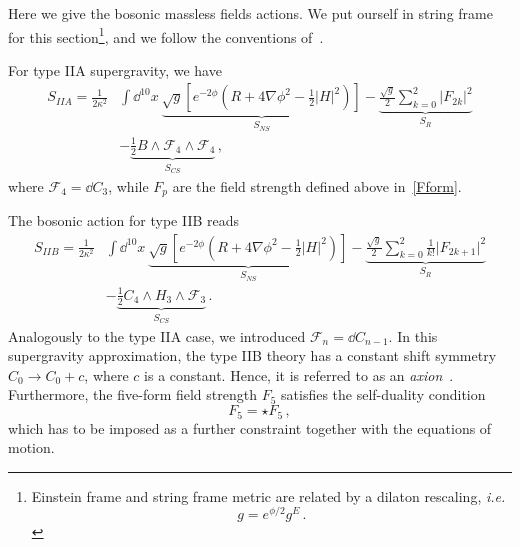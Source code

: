 \documentclass[debug]{phd}
\begin{document}
				 Here we give the bosonic massless fields actions. 
				 We put ourself in string frame for this section\footnote{%
				 	Einstein frame and string frame metric are related by a dilaton rescaling, \emph{i.e.}
							\begin{equation*}
								g = e^{\phi/2} g^E \, .
							\end{equation*}
					},
					and we follow the conventions of~\cite{DemSugra}.
				 
				 For type IIA supergravity, we have
						\begin{equation*}
							\begin{split}
								S_{IIA} = \frac{1}{2\kappa^2}& \int \dd^{10} x \ \underbrace{\sqrt{g} \left[ e^{-2\phi} \left(R + 4 \nabla \phi ^2 - \frac{1}{2} \lvert H \rvert^2 \right)\right]}_{S_{NS}} - \underbrace{\frac{\sqrt{g}}{2} \sum_{k=0}^2 \lvert F_{2k} \rvert^2}_{S_{R}} \\
								&- \underbrace{\frac{1}{2} B \wedge \mathcal{F}_4 \wedge \mathcal{F}_4}_{S_{CS}} \, ,
							\end{split}		
						\end{equation*}
				 where $\mathcal{F}_4 = \dd C_3$, while $F_p$ are the field strength defined above in~\eqref{Fform}.

				The bosonic action for type IIB reads 
						\begin{equation*}
							\begin{split}
							S_{IIB} = \frac{1}{2\kappa^2}& \int \dd^{10} x \ \underbrace{\sqrt{g} \left[ e^{-2\phi} \left(R + 4 \nabla \phi ^2 - \frac{1}{2} \lvert H \rvert^2 \right)\right]}_{S_{NS}} - \underbrace{\frac{\sqrt{g}}{2} \sum_{k=0}^2 \frac{1}{k!}\lvert F_{2k+1} \rvert^2}_{S_{R}} \\
															& - \underbrace{\frac{1}{2} C_4 \wedge H_3 \wedge \mathcal{F}_3}_{S_{CS}} \, .
							\end{split}							
						\end{equation*}
				Analogously to the type IIA case, we introduced $\mathcal{F}_n = \dd C_{n-1}$.
				In this supergravity approximation, the type IIB theory has a constant shift symmetry $C_0 \rightarrow C_0 + c$, where $c$ is a constant. 
				Hence, it is referred to as an \emph{axion}~\cite{BeckerBeckerSchw, Weinberg:1977ma}.
				Furthermore, the five-form field strength $F_5$ satisfies the self-duality condition
						\begin{equation}\label{F5dual}
							F_5 = \star F_5 \, ,
						\end{equation}
				which has to be imposed as a further constraint together with the equations of motion.
				
\end{document}
